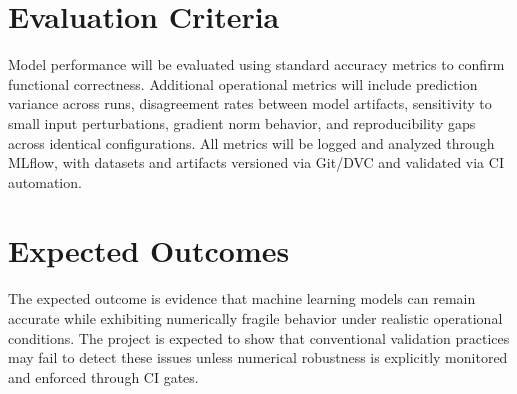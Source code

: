 \documentclass[11pt]{article}
\begin{document}
\section*{Evaluation Criteria}
Model performance will be evaluated using standard accuracy metrics to confirm functional correctness. Additional operational metrics will include prediction variance across runs, disagreement rates between model artifacts, sensitivity to small input perturbations, gradient norm behavior, and reproducibility gaps across identical configurations. All metrics will be logged and analyzed through MLflow, with datasets and artifacts versioned via Git/DVC and validated via CI automation.

\section*{Expected Outcomes}
The expected outcome is evidence that machine learning models can remain accurate while exhibiting numerically fragile behavior under realistic operational conditions. The project is expected to show that conventional validation practices may fail to detect these issues unless numerical robustness is explicitly monitored and enforced through CI gates.
\end{document}
